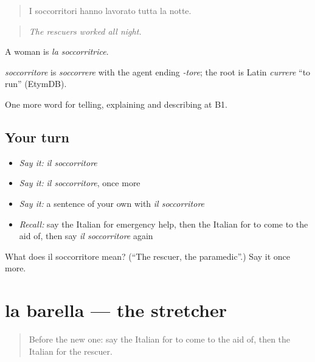 \begin{quote}
I soccorritori hanno lavorato tutta la notte.
\end{quote}

\begin{quote}
\emph{The rescuers worked all night.}
\end{quote}

A woman is \emph{la soccorritrice}.

\begin{cousinweb}
\emph{soccorritore} is \emph{soccorrere} with the agent ending \emph{-tore}; the root is Latin \emph{currere} \textquotedblleft{}to run\textquotedblright{} (EtymDB).
\end{cousinweb}

\begin{grammarlens}[title={What you've built}]
One more word for telling, explaining and describing at B1.
\end{grammarlens}

\subsection*{Your turn}
\begin{itemize}
\raggedright
  \item \emph{Say it:} \emph{il soccorritore}
  \item \emph{Say it:} \emph{il soccorritore}, once more
  \item \emph{Say it:} a sentence of your own with \emph{il soccorritore}
  \item \emph{Recall:} say the Italian for emergency help, then the Italian for to come to the aid of, then say \emph{il soccorritore} again
\end{itemize}

\begin{tcolorbox}[breakable,colback=teal!4,colframe=teal!35!black,title={Before you move on}]
What does il soccorritore mean? (\textquotedblleft{}The rescuer, the paramedic\textquotedblright{}.) Say it once more.
\end{tcolorbox}
\section[la barella]{la barella — the stretcher}

\label{lesson:IT-C301-barella}



\begin{quote}
Before the new one: say the Italian for to come to the aid of, then the Italian for the rescuer.
\end{quote}

